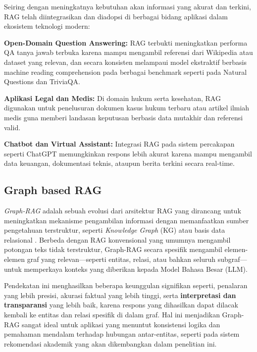 \begin{subsectcontent}
		Seiring dengan meningkatnya kebutuhan akan informasi yang akurat dan terkini, RAG telah diintegrasikan dan diadopsi di berbagai bidang aplikasi dalam ekosistem teknologi modern:
		\begin{subsectlist}
			\begin{packed_item}
				\item \textbf{Open-Domain Question Answering:} RAG terbukti meningkatkan performa QA tanya jawab terbuka karena mampu mengambil referensi dari Wikipedia atau dataset yang relevan, dan secara konsisten melampaui model ekstraktif berbasis machine reading comprehension pada berbagai benchmark seperti pada Natural Questions dan TriviaQA.
				\item \textbf{Aplikasi Legal dan Medis:} Di domain hukum serta kesehatan, RAG digunakan untuk penelusuran dokumen kasus hukum terbaru atau artikel ilmiah medis guna memberi landasan keputusan berbasis data mutakhir dan referensi valid.
				\item \textbf{Chatbot dan Virtual Assistant:} Integrasi RAG pada sistem percakapan seperti ChatGPT memungkinkan respons lebih akurat karena mampu mengambil data keuangan, dokumentasi teknis, ataupun berita terkini secara real-time.
			\end{packed_item}
		\end{subsectlist}
	\end{subsectcontent}

\subsection{Graph based RAG}
\begin{subsectcontent}
	\indent \textit{Graph-RAG} adalah sebuah evolusi dari arsitektur RAG yang dirancang untuk meningkatkan mekanisme pengambilan informasi dengan memanfaatkan sumber pengetahuan terstruktur, seperti \textit{Knowledge Graph} (KG) atau basis data relasional \cite{peng2024graphretrievalaugmentedgenerationsurvey}. Berbeda dengan RAG konvensional yang umumnya mengambil potongan teks tidak terstruktur, Graph-RAG secara spesifik mengambil elemen-elemen graf yang relevan—seperti entitas, relasi, atau bahkan seluruh subgraf—untuk memperkaya konteks yang diberikan kepada Model Bahasa Besar (LLM).
	
	Pendekatan ini menghasilkan beberapa keunggulan signifikan seperti, penalaran yang lebih presisi, akurasi faktual yang lebih tinggi, serta \textbf{interpretasi dan transparansi} yang lebih baik, karena respons yang dihasilkan dapat dilacak kembali ke entitas dan relasi spesifik di dalam graf. Hal ini menjadikan Graph-RAG sangat ideal untuk aplikasi yang menuntut konsistensi logika dan pemahaman mendalam terhadap hubungan antar-entitas, seperti pada sistem rekomendasi akademik yang akan dikembangkan dalam penelitian ini.
\end{subsectcontent}

